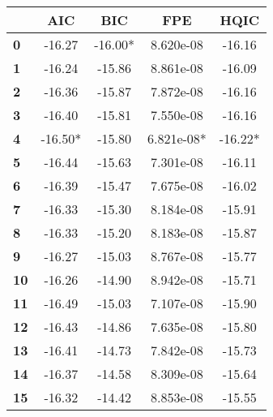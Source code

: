 \begin{center}
\begin{tabular}{lcccc}
\toprule
            & \textbf{AIC} & \textbf{BIC} & \textbf{FPE} & \textbf{HQIC}  \\
\midrule
\textbf{0}  &      -16.27  &     -16.00*  &   8.620e-08  &       -16.16   \\
\textbf{1}  &      -16.24  &      -15.86  &   8.861e-08  &       -16.09   \\
\textbf{2}  &      -16.36  &      -15.87  &   7.872e-08  &       -16.16   \\
\textbf{3}  &      -16.40  &      -15.81  &   7.550e-08  &       -16.16   \\
\textbf{4}  &     -16.50*  &      -15.80  &  6.821e-08*  &      -16.22*   \\
\textbf{5}  &      -16.44  &      -15.63  &   7.301e-08  &       -16.11   \\
\textbf{6}  &      -16.39  &      -15.47  &   7.675e-08  &       -16.02   \\
\textbf{7}  &      -16.33  &      -15.30  &   8.184e-08  &       -15.91   \\
\textbf{8}  &      -16.33  &      -15.20  &   8.183e-08  &       -15.87   \\
\textbf{9}  &      -16.27  &      -15.03  &   8.767e-08  &       -15.77   \\
\textbf{10} &      -16.26  &      -14.90  &   8.942e-08  &       -15.71   \\
\textbf{11} &      -16.49  &      -15.03  &   7.107e-08  &       -15.90   \\
\textbf{12} &      -16.43  &      -14.86  &   7.635e-08  &       -15.80   \\
\textbf{13} &      -16.41  &      -14.73  &   7.842e-08  &       -15.73   \\
\textbf{14} &      -16.37  &      -14.58  &   8.309e-08  &       -15.64   \\
\textbf{15} &      -16.32  &      -14.42  &   8.853e-08  &       -15.55   \\
\bottomrule
\end{tabular}
\end{center}